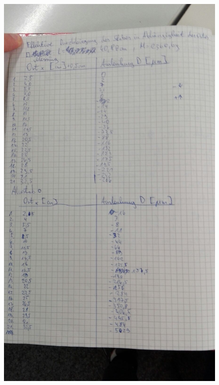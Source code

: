 \documentclass[
  bibliography=totoc,     %
  captions=tableheading,  %
  titlepage=firstiscover, %
]{scrartcl}
\begin{document}
\begin{figure}[H]
    \includegraphics[width=1\textwidth]{V1035.jpeg}
    \label{fig:1035}
\end{figure}\begin{figure}[H]
    \centering

\end{figure}
\end{document}
